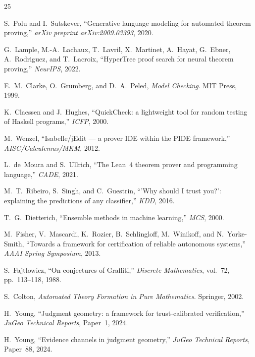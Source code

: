 \documentclass[11pt]{article}
\begin{document}
\begin{thebibliography}{25}

S.~Polu and I.~Sutskever,
``Generative language modeling for automated theorem proving,''
\emph{arXiv preprint arXiv:2009.03393}, 2020.

G.~Lample, M.-A.~Lachaux, T.~Lavril, X.~Martinet,
A.~Hayat, G.~Ebner, A.~Rodriguez, and T.~Lacroix,
``HyperTree proof search for neural theorem proving,''
\emph{NeurIPS}, 2022.

E.~M.~Clarke, O.~Grumberg, and D.~A.~Peled,
\emph{Model Checking}.
MIT Press, 1999.

K.~Claessen and J.~Hughes,
``QuickCheck: a lightweight tool for random testing of
Haskell programs,''
\emph{ICFP}, 2000.

M.~Wenzel,
``Isabelle/jEdit --- a prover IDE within the PIDE framework,''
\emph{AISC/Calculemus/MKM}, 2012.

L.~de~Moura and S.~Ullrich,
``The Lean~4 theorem prover and programming language,''
\emph{CADE}, 2021.

M.~T.~Ribeiro, S.~Singh, and C.~Guestrin,
``'Why should I trust you?': explaining the predictions
of any classifier,''
\emph{KDD}, 2016.

T.~G.~Dietterich,
``Ensemble methods in machine learning,''
\emph{MCS}, 2000.

M.~Fisher, V.~Mascardi, K.~Rozier, B.~Schlingloff,
M.~Winikoff, and N.~Yorke-Smith,
``Towards a framework for certification of reliable
autonomous systems,''
\emph{AAAI Spring Symposium}, 2013.

S.~Fajtlowicz,
``On conjectures of Graffiti,''
\emph{Discrete Mathematics}, vol.~72, pp.~113--118, 1988.

S.~Colton,
\emph{Automated Theory Formation in Pure Mathematics}.
Springer, 2002.

H.~Young,
``Judgment geometry: a framework for trust-calibrated
verification,''
\emph{JuGeo Technical Reports}, Paper~1, 2024.

H.~Young,
``Evidence channels in judgment geometry,''
\emph{JuGeo Technical Reports}, Paper~88, 2024.


\end{thebibliography}
\end{document}
